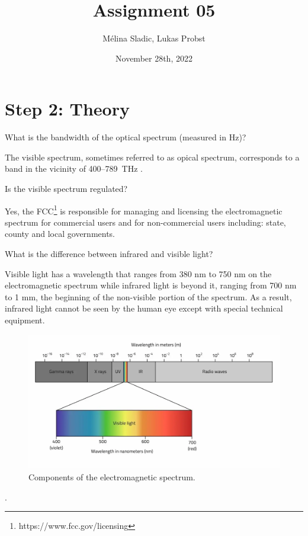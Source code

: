 \documentclass[
	12pt, %
]{fphw}
\title{Assignment 05} %
\author{Mélina Sladic, Lukas Probst} %
\date{November 28th, 2022} %
\institute{Eidgenössische Technische Hochschule Zürich} %
\begin{document}
\maketitle %


\section*{Step 2: Theory}

\begin{problem}
	What is the bandwidth of the optical spectrum (measured in Hz)?
\end{problem}
The visible spectrum, sometimes referred to as opical spectrum, corresponds to a band in the vicinity of 400–789 THz \cite{20.500.11850/125771}.

\begin{problem}
	Is the visible spectrum regulated?
\end{problem}
Yes, the FCC\footnote{https://www.fcc.gov/licensing} is responsible for managing and licensing the electromagnetic spectrum for commercial users and for non-commercial users including: state, county and local governments.

\begin{problem}
	What is the difference between infrared and visible light?
\end{problem}
Visible light has a wavelength that ranges from 380 nm to 750 nm on the electromagnetic spectrum while infrared light is beyond it, ranging from 700 nm to 1 mm, the beginning of the non-visible portion of the spectrum. As a result, infrared light cannot be seen by the human eye except with special technical equipment. 
\begin{figure}[!htbp] 
	\centering
	\includegraphics[width=1\columnwidth]{figures/electromagnetic_spectrum.png}
	\caption{Components of the electromagnetic spectrum.}
	\label{fig:electromagnetic_spectrum}
\end{figure}
\FloatBarrier. 
\end{document}
